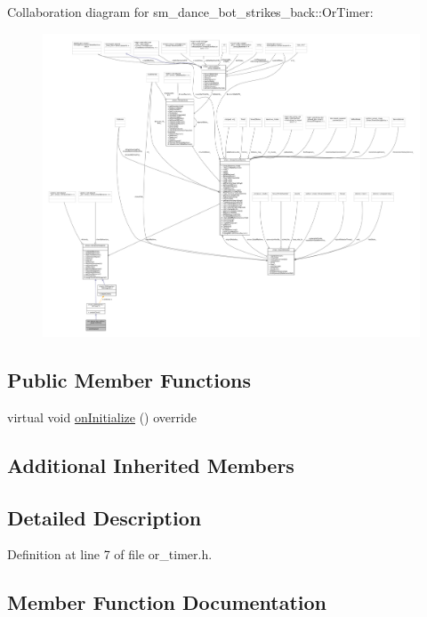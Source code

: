 Collaboration diagram for sm\+\_\+dance\+\_\+bot\+\_\+strikes\+\_\+back\+:\+:Or\+Timer\+:
\nopagebreak
\begin{figure}[H]
\begin{center}
\leavevmode
\includegraphics[width=350pt]{classsm__dance__bot__strikes__back_1_1OrTimer__coll__graph}
\end{center}
\end{figure}
\subsection*{Public Member Functions}
\begin{DoxyCompactItemize}
\item 
virtual void \hyperlink{classsm__dance__bot__strikes__back_1_1OrTimer_a89c7a3040c7d44d877d8b85b89883cb1}{on\+Initialize} () override
\end{DoxyCompactItemize}
\subsection*{Additional Inherited Members}


\subsection{Detailed Description}


Definition at line 7 of file or\+\_\+timer.\+h.



\subsection{Member Function Documentation}
\mbox{\label{classsm__dance__bot__strikes__back_1_1OrTimer_a89c7a3040c7d44d877d8b85b89883cb1}} 
